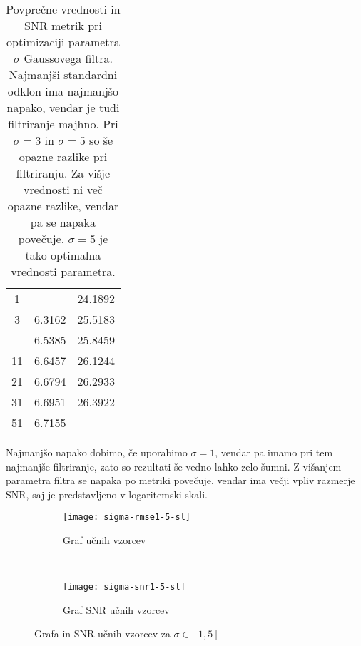 \begin{table}[!htb]
	\centering
	\begin{tabular}{S[table-format=2.0, round-mode=places, round-precision=2] S[table-format=1.2, round-mode=places, round-precision=2] S[table-format=2.2, round-mode=places, round-precision=2]}
		\toprule
		\theadm{\sigma} & \thead{\rmse} &   \\
		 &  & 24.1892\\
		3 & 6.3162 & 25.5183\\
		 & 6.5385 & 25.8459\\
		11 & 6.6457 & 26.1244\\
		21 & 6.6794 & 26.2933\\
		31 & 6.6951 & 26.3922\\
		51 & 6.7155 & \\
		\bottomrule
	\end{tabular}
	\caption[Metrike pri optimizaciji Gaussovega filtra]{Povprečne vrednosti \rmse in SNR metrik pri optimizaciji parametra $\sigma$ Gaussovega filtra. Najmanjši standardni odklon ima najmanjšo napako, vendar je tudi filtriranje majhno. Pri $\sigma=3$ in $\sigma=5$ so še opazne razlike pri filtriranju. Za višje vrednosti ni več opazne razlike, vendar pa se napaka povečuje. $\sigma=5$ je tako optimalna vrednosti parametra.}
	\label{tab:gauss}
\end{table}

Najmanjšo napako dobimo, če uporabimo $\sigma=1$, vendar pa imamo pri tem najmanjše filtriranje, zato so rezultati še vedno lahko zelo šumni. Z višanjem parametra filtra se napaka po metriki \rmse povečuje, vendar ima večji vpliv razmerje SNR, saj je predstavljeno v logaritemski skali. 

\begin{figure}[!htb]
	\centering
	\begin{subfigure}[t]{0.45\columnwidth}
		\texttt{[image: sigma-rmse1-5-sl]}
		\caption{Graf \rmse  učnih vzorcev }
		\label{fig:sigma-rmse1-5}
	\end{subfigure}
	~
	\begin{subfigure}[t]{0.45\columnwidth}
		\texttt{[image: sigma-snr1-5-sl]}
		\caption{Graf SNR  učnih vzorcev}
		\label{fig:sigma-snr1-5}
	\end{subfigure}
	\caption{Grafa \rmse in SNR učnih vzorcev za \mbox{$\sigma \in [1,5]$}}
	\label{fig:sigma1-5}
\end{figure}

